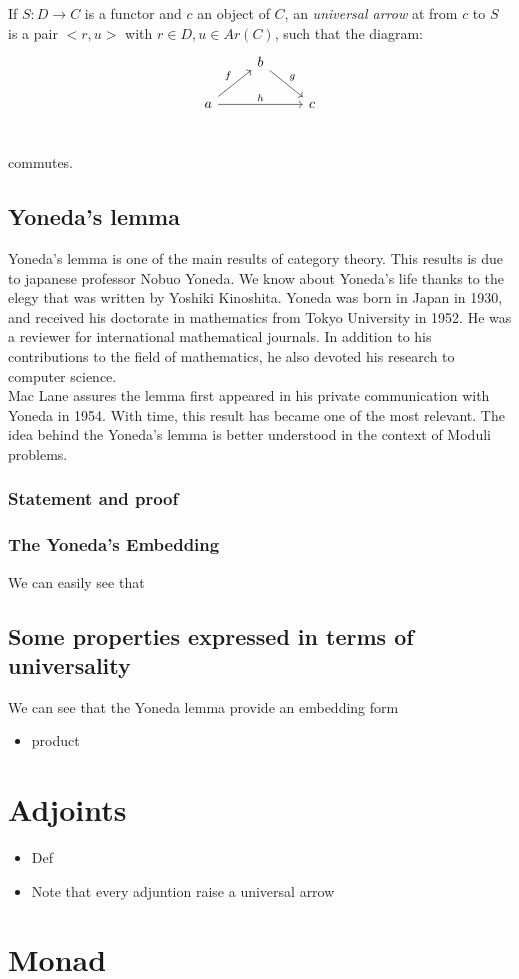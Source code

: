\begin{definition}
  If $S: D \to C$ is a functor and $c$ an object of $C$, an \emph{universal arrow} at from $c$ to $S$ is a pair $<r,u>$ with $r\in D, u \in Ar(C)$, such that the diagram:
  \[
    \begin{tikzcd}
      & b \arrow[rd, "g"]& \\
      a\arrow[ru, "f"] \arrow[rr, "h"] && c\\
    \end{tikzcd}
  \]

  commutes. 
\end{definition}

\subsection{Yoneda's lemma}
Yoneda's lemma is one of the main results of category theory. This results is due to japanese professor Nobuo Yoneda. We know about Yoneda's life thanks to the elegy that was written by Yoshiki Kinoshita\cite{yonedaLife}. Yoneda was born in Japan in 1930, and received his doctorate in mathematics from Tokyo University in 1952. He was a reviewer for international mathematical journals. In addition to his contributions to the field of mathematics, he also devoted his research to computer science.\\

Mac Lane\cite{mac2013categories} assures the lemma first appeared in his private communication with Yoneda in 1954. With time, this result has became one of the most relevant. The idea behind the Yoneda's lemma is better understood in the context of Moduli problems. 

\subsubsection{Statement and proof}

\subsubsection{The Yoneda's Embedding}
We can easily see that 


\subsection{Some properties expressed in terms of universality}
We can see that the Yoneda lemma provide an embedding form 

\begin{itemize}
\item product \label{prod-univ}
\end{itemize}
\section{Adjoints}


\begin{itemize}
\item Def
\item Note that every adjuntion raise a universal arrow
\end{itemize}

\section{Monad}